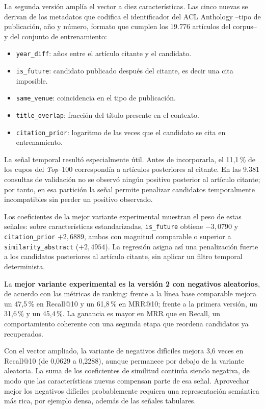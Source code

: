 \documentclass[9pt]{article}
\begin{document}
La segunda versión amplía el vector a diez características. Las cinco nuevas se
derivan de los metadatos que codifica el identificador del ACL Anthology
--tipo de publicación, año y número, formato que cumplen los 19.776 artículos
del corpus-- y del conjunto de entrenamiento:

\begin{itemize}[leftmargin=1.4em, itemsep=1pt, topsep=2pt]
  \item \texttt{year\_diff}: años entre el artículo citante y el candidato.
  \item \texttt{is\_future}: candidato publicado después del citante, es decir
        una cita imposible.
  \item \texttt{same\_venue}: coincidencia en el tipo de publicación.
  \item \texttt{title\_overlap}: fracción del título presente en el contexto.
  \item \texttt{citation\_prior}: logaritmo de las veces que el candidato se
        cita en entrenamiento.
\end{itemize}

La señal temporal resultó especialmente útil. Antes de incorporarla, el
11,1\,\% de los cupos del \emph{Top}--100 correspondía a artículos posteriores
al citante. En las 9.381 consultas de validación no se observó ningún positivo
posterior al artículo citante; por tanto, en esa partición la señal permite
penalizar candidatos temporalmente incompatibles sin perder un positivo
observado.

Los coeficientes de la mejor variante experimental muestran el peso de estas
señales: sobre características estandarizadas, \texttt{is\_future} obtiene
$-3{,}0790$ y \texttt{citation\_prior} $+2{,}6889$, ambos con magnitud
comparable o superior a \texttt{similarity\_abstract} ($+2{,}4954$). La
regresión asigna así una penalización fuerte a los candidatos posteriores al
artículo citante, sin aplicar un filtro temporal determinista.

\medskip

La \textbf{mejor variante experimental es la versión 2 con negativos
aleatorios}, de acuerdo con las métricas de ranking: frente a la línea base
comparable mejora un 47,5\,\% en Recall@10 y un 61,8\,\% en MRR@10; frente a
la primera versión, un 31,6\,\% y un 45,4\,\%. La ganancia es mayor en MRR
que en Recall, un comportamiento coherente con una segunda etapa que reordena
candidatos ya recuperados.

Con el vector ampliado, la variante de negativos difíciles mejora 3,6 veces en
Recall@10 (de 0,0629 a 0,2288), aunque permanece por debajo de la variante
aleatoria. La suma de los coeficientes de similitud continúa siendo negativa, de
modo que las características nuevas compensan parte de esa señal. Aprovechar
mejor los negativos difíciles probablemente requiera una representación
semántica más rica, por ejemplo densa, además de las señales tabulares.
\end{document}
